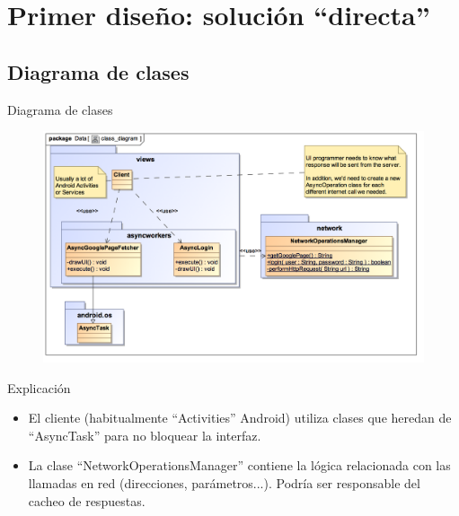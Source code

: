 \documentclass{beamer}
\begin{document}
\section{Primer diseño: solución ``directa''}
\subsection{Diagrama de clases}
\begin{frame}{Diagrama de clases}
\begin{figure}
\begin{center}
\includegraphics[scale=0.6]{../naive/design_models/class_diagram}
\end{center}
\end{figure}
\end{frame}

\begin{frame}{Explicación}
\begin{itemize}
\item El cliente (habitualmente ``Activities'' Android) utiliza clases que heredan de ``AsyncTask'' para no bloquear la interfaz.
\item La clase ``NetworkOperationsManager'' contiene la lógica relacionada con las llamadas en red (direcciones, parámetros...). Podría ser responsable del cacheo de respuestas.
\end{itemize}
\end{frame}
\end{document}

